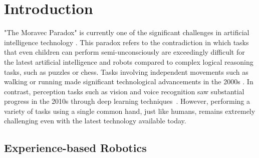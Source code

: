

\section{Introduction}

"The Moravec Paradox" is currently one of the significant challenges in artificial intelligence technology \cite{Moravec1988mind}. This paradox refers to the contradiction in which tasks that even children can perform semi-unconsciously are exceedingly difficult for the latest artificial intelligence and robots compared to complex logical reasoning tasks, such as puzzles or chess. Tasks involving independent movements such as walking or running made significant technological advancements in the 2000s \cite{Garcia1996,Hirai1998}. In contrast, perception tasks such as vision and voice recognition saw substantial progress in the 2010s through deep learning techniques~\cite{Krizhevsky2012nips,He2016cvpr,Ren2016pami,Redmon2016cvpr,Hinton2013spm,Graves2014icml}. However, performing a variety of tasks using a single common hand, just like humans, remains extremely challenging even with the latest technology available today.



\subsection{Experience-based Robotics}

